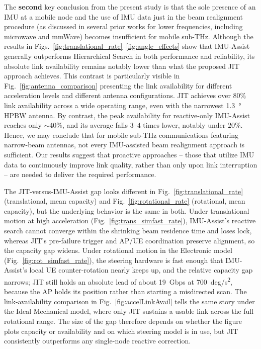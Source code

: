 \documentclass[fleqn,10pt]{wlscirep}
\newcommand{\rev}[1]{{\color{revblue}#1}}
\begin{document}
The \textbf{second} key conclusion from the present study is that the sole presence of an IMU at a mobile node and the use of IMU data just in the beam realignment procedure (as discussed in several prior works for lower frequencies, including microwave and mmWave) becomes insufficient for mobile sub-THz. Although the results in Figs.~\ref{fig:translational_rate}--\ref{fig:angle_effects} show that IMU-Assist generally outperforms Hierarchical Search in both performance and reliability, its absolute link availability remains notably lower than what the proposed JIT approach achieves. This contrast is particularly visible in Fig.~\ref{fig:antenna_comparison} presenting the link availability for different acceleration levels and different antenna configurations. JIT achieves over $80\%$ link availability across a wide operating range, even with the narrowest \SI{1.3}{\degree} HPBW antenna. By contrast, the peak availability for reactive-only IMU-Assist reaches only ${\sim}40\%$, and its average falls 3--4 times lower, notably under $20\%$. Hence, we may conclude that for mobile sub-THz communications featuring narrow-beam antennas, not every IMU-assisted beam realignment approach is sufficient. Our results suggest that proactive approaches -- those that utilize IMU data to continuously improve link quality, rather than only upon link interruption -- are needed to deliver the required performance.

\rev{The JIT-versus-IMU-Assist gap looks different in Fig.~\ref{fig:translational_rate} (translational, mean capacity) and Fig.~\ref{fig:rotational_rate} (rotational, mean capacity), but the underlying behavior is the same in both. Under translational motion at high acceleration (Fig.~\ref{fig:trans_simfast_rate}), IMU-Assist's reactive search cannot converge within the shrinking beam residence time and loses lock, whereas JIT's pre-failure trigger and AP/UE coordination preserve alignment, so the capacity gap widens. Under rotational motion in the Electronic model (Fig.~\ref{fig:rot_simfast_rate}), the steering hardware is fast enough that IMU-Assist's local UE counter-rotation nearly keeps up, and the relative capacity gap narrows; JIT still holds an absolute lead of about \SI{19}{Gbps} at \SI{700}{deg/s^2}, because the AP holds its position rather than starting a misdirected scan. The link-availability comparison in Fig.~\ref{fig:accelLinkAvail} tells the same story under the Ideal Mechanical model, where only JIT sustains a usable link across the full rotational range. The size of the gap therefore depends on whether the figure plots capacity or availability and on which steering model is in use, but JIT consistently outperforms any single-node reactive correction.}
\end{document}
